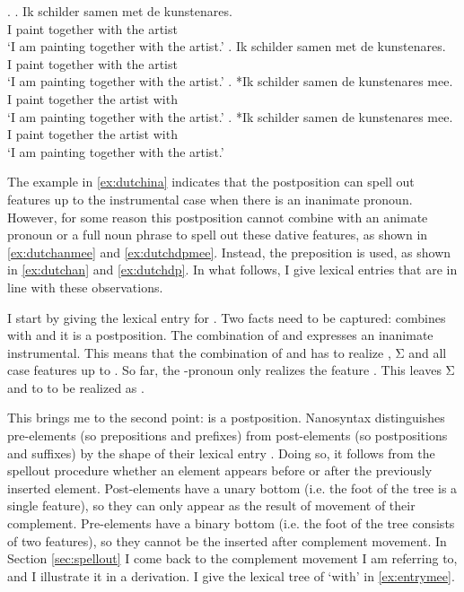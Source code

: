 \documentclass[11pt,a4paper]{article}
\begin{document}
\ex.
\ag. Ik schilder samen met de kunstenares.\\
 I paint together with the artist\\
 `I am painting together with the artist.'\label{ex:dutchan}
\bg. Ik schilder samen met de kunstenares.\\
 I paint together with the artist\\
 `I am painting together with the artist.'\label{ex:dutchdp}
\bg. *Ik schilder samen de kunstenares mee.\\
 I paint together the artist with\\
 `I am painting together with the artist.'\label{ex:dutchanmee}
\bg. *Ik schilder samen de kunstenares mee.\\
 I paint together the artist with\\
 `I am painting together with the artist.'\label{ex:dutchdpmee}

The example in \ref{ex:dutchina} indicates that the postposition  can spell out features up to the instrumental case when there is an inanimate pronoun. However, for some reason this postposition cannot combine with an animate pronoun or a full noun phrase to spell out these dative features, as shown in \ref{ex:dutchanmee} and \ref{ex:dutchdpmee}. Instead, the preposition  is used, as shown in \ref{ex:dutchan} and \ref{ex:dutchdp}.
In what follows, I give lexical entries that are in line with these observations.

I start by giving the lexical entry for . Two facts need to be captured:  combines with  and it is a postposition. The combination of  and  expresses an inanimate instrumental.
This means that the combination of  and  has to realize , Σ and all case features up to . So far, the -pronoun  only realizes the feature . This leaves Σ and  to  to be realized as .

This brings me to the second point:  is a postposition. Nanosyntax distinguishes pre-elements (so prepositions and prefixes) from post-elements (so postpositions and suffixes) by the shape of their lexical entry \citep{starke2018}. Doing so, it follows from the spellout procedure whether an element appears before or after the previously inserted element. Post-elements have a unary bottom (i.e. the foot of the tree is a single feature), so they can only appear as the result of movement of their complement. Pre-elements have a binary bottom (i.e. the foot of the tree consists of two features), so they cannot be the inserted after complement movement. In Section \ref{sec:spellout} I come back to the complement movement I am referring to, and I illustrate it in a derivation. I give the lexical tree of  `with' in \ref{ex:entrymee}.
\end{document}
